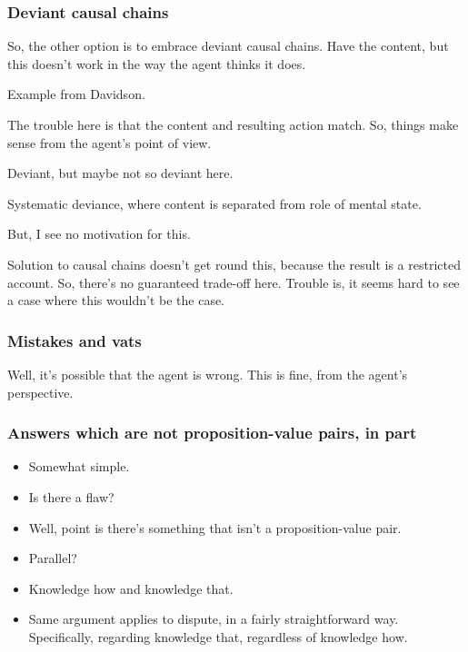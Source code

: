 \subsubsection{Deviant causal chains}
\label{sec:devi-caus-chains}

\begin{note}
  So, the other option is to embrace deviant causal chains.
  Have the content, but this doesn't work in the way the agent thinks it does.

  Example from Davidson.

  The trouble here is that the content and resulting action match.
  So, things make sense from the agent's point of view.

  Deviant, but maybe not so deviant here.

  Systematic deviance, where content is separated from role of mental state.

  But, I see no motivation for this.

  Solution to causal chains doesn't get round this, because the result is a restricted account.
  So, there's no guaranteed trade-off here.
  Trouble is, it seems hard to see a case where this wouldn't be the case.

  
\end{note}

\subsubsection{Mistakes and vats}

\begin{note}
  Well, it's possible that the agent is wrong.
  This is fine, from the agent's perspective.
\end{note}


\subsubsection{Answers which are not proposition-value pairs, in part}
\label{sec:answers-which-are}

\begin{note}
  \begin{itemize}
  \item
    Somewhat simple.
  \item
    Is there a flaw?
  \item
    Well, point is there's something that isn't a proposition-value pair.
  \item
    Parallel?
  \item
    Knowledge how and knowledge that.
  \item
    Same argument applies to dispute, in a fairly straightforward way.
    Specifically, regarding knowledge that, regardless of knowledge how.
  \end{itemize}
\end{note}

